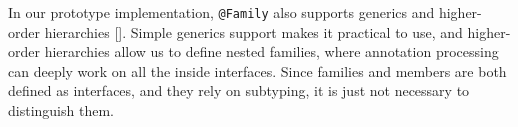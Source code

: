 In our prototype implementation, \lstinline|@Family| also supports generics and higher-order hierarchies [].
Simple generics support makes it practical to use, and higher-order hierarchies allow us to define nested families,
where annotation processing can deeply work on all the inside interfaces. Since families and members are both defined
as interfaces, and they rely on subtyping, it is just not necessary to distinguish them.





